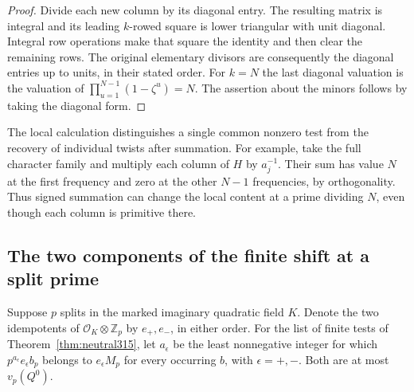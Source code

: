 \documentclass[a4paper,11pt]{article}
\theoremstyle{definition}
\theoremstyle{remark}
\newcommand{\ZZ}{\mathbb Z}\newcommand{\ord}{\operatorname{ord}}
\numberwithin{equation}{section}
\newcommand{\OO}{\mathcal O}
\begin{document}
\begin{proof}
Divide each new column by its diagonal entry. The resulting
matrix is integral and its leading \(k\)-rowed square is
lower triangular with unit diagonal. Integral row operations
make that square the identity and then clear the remaining
rows. The original elementary divisors are consequently
the diagonal entries up to units, in their stated order.
For \(k=N\) the last diagonal valuation is the valuation
of \(\prod_{u=1}^{N-1}(1-\zeta^u)=N\). The assertion
about the minors follows by taking the diagonal form.
\end{proof}

The local calculation distinguishes a single common nonzero
test from the recovery of individual twists after summation.
For example, take the full character family and multiply
each column of \(H\) by \(a_j^{-1}\). Their sum has value
\(N\) at the first frequency and zero at the other \(N-1\)
frequencies, by orthogonality. Thus signed summation can
change the local content at a prime dividing \(N\), even
though each column is primitive there.

\subsection{The two components of the finite shift at a split prime}\label{nav:VII-64}
Suppose \(p\) splits in the marked imaginary quadratic field \(K\).
Denote the two idempotents of \(\OO_K\otimes\ZZ_p\) by
\(e_+,e_-\), in either order. For the list of finite tests of
Theorem~\ref{thm:neutral315}, let \(a_\epsilon\) be the least
nonnegative integer for which \(p^{a_\epsilon}e_\epsilon b_p\)
belongs to \(e_\epsilon M_p\) for every occurring \(b\), with
\(\epsilon=+,-\). Both are at most \(v_p(Q^0)\).
\end{document}
